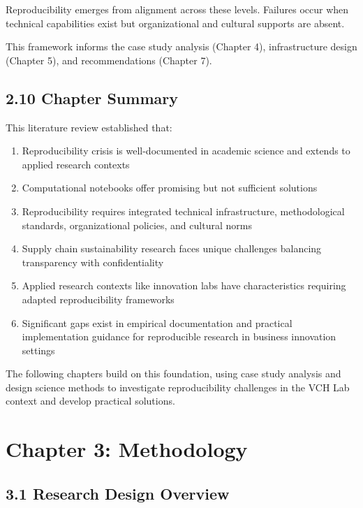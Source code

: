 \documentclass[
  oneside,
  open=any]{scrbook}
\providecommand{\tightlist}{%
  \setlength{\itemsep}{0pt}\setlength{\parskip}{0pt}}\usepackage{longtable,booktabs,array}
\begin{document}
Reproducibility emerges from alignment across these levels. Failures
occur when technical capabilities exist but organizational and cultural
supports are absent.

This framework informs the case study analysis (Chapter 4),
infrastructure design (Chapter 5), and recommendations (Chapter 7).

\section{2.10 Chapter Summary}\label{chapter-summary}

This literature review established that:

\begin{enumerate}
\def\labelenumi{\arabic{enumi}.}
\tightlist
\item
  Reproducibility crisis is well-documented in academic science and
  extends to applied research contexts
\item
  Computational notebooks offer promising but not sufficient solutions
\item
  Reproducibility requires integrated technical infrastructure,
  methodological standards, organizational policies, and cultural norms
\item
  Supply chain sustainability research faces unique challenges balancing
  transparency with confidentiality
\item
  Applied research contexts like innovation labs have characteristics
  requiring adapted reproducibility frameworks
\item
  Significant gaps exist in empirical documentation and practical
  implementation guidance for reproducible research in business
  innovation settings
\end{enumerate}

The following chapters build on this foundation, using case study
analysis and design science methods to investigate reproducibility
challenges in the VCH Lab context and develop practical solutions.

\chapter{Chapter 3: Methodology}\label{chapter-3-methodology}

\section{3.1 Research Design Overview}\label{research-design-overview}
\end{document}
